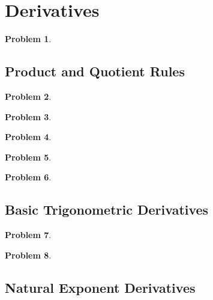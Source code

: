 \documentclass{article}
\newtheorem{problem}{Problem}
\begin{document}
\section{Derivatives}
\begin{problem}

\end{problem}
\subsection{Product and Quotient Rules}

\begin{problem}

\end{problem}


\begin{problem}

\end{problem}

\begin{problem}

\end{problem}


\begin{problem}

\end{problem}


\begin{problem}

\end{problem}

\subsection{Basic Trigonometric Derivatives}
\begin{problem}

\end{problem}
\begin{problem}

\end{problem}
\subsection{Natural Exponent Derivatives}

\end{document}
